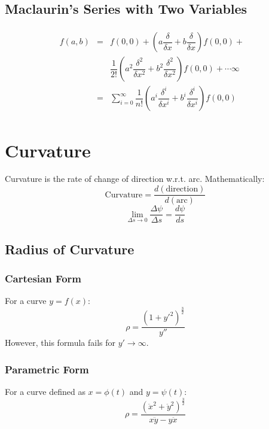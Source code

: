 \subsection{Maclaurin's Series with Two Variables}
\begin{equation}
	\begin{aligned}
		\begin{split}
			f(a,b)&=&f(0,0)+\left(a\dfrac{\delta}{\delta x}+b\dfrac{\delta}{\delta x}\right)f(0,0)+&\\& &\dfrac{1}{2!}\left(a^2\dfrac{\delta^2}{\delta x^2}+b^2\dfrac{\delta^2}{\delta x^2}\right)f(0,0)+\cdots\infty&\\
			& = & \sum_{i=0}^\infty \dfrac{1}{n!}\left(a^i\dfrac{\delta^i}{\delta x^i}+b^i\dfrac{\delta^i}{\delta x^i}\right)f(0,0)
		\end{split}
	\end{aligned}
\end{equation}

\section{Curvature}
Curvature is the rate of change of direction w.r.t. arc. Mathematically:
\begin{equation}
	\text{Curvature}=\dfrac{d(\text{direction})}{d(\text{arc})}\nonumber
\end{equation}
\begin{equation}
	\lim_{\Delta s \to 0} \dfrac{\Delta \psi}{\Delta s}=\dfrac{d\psi}{ds}
\end{equation}

\subsection{Radius of Curvature}
\subsubsection{Cartesian Form}
For a curve $y=f(x)$:
\begin{equation}
	\rho=\dfrac{(1+y'^2)^{\frac{3}{2}}}{y''}
\end{equation}
However, this formula fails for $y'\to\infty$.
\subsubsection{Parametric Form}
For a curve defined as $x=\phi(t)$ and $y=\psi(t)$:
\begin{equation}
	\rho=\dfrac{(\ddot{x}^2+\ddot{y}^2)^{\frac{3}{2}}}{x\ddot{y}-y\ddot{x}}
\end{equation}

